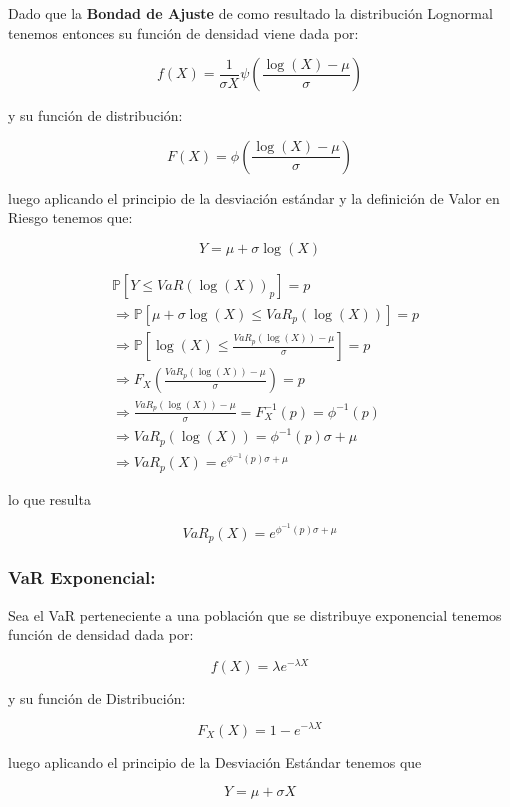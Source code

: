 \documentclass[]{article}
\begin{document}
Dado que la \textbf{Bondad de Ajuste} de como resultado la distribución
Lognormal tenemos entonces su función de densidad viene dada por:

\[f(X)=\frac{1}{\sigma X} \psi(\frac{\log(X)-\mu}{\sigma})\]

y su función de distribución:

\[F(X)=\phi(\frac{\log(X)-\mu}{\sigma})\]

luego aplicando el principio de la desviación estándar y la definición
de Valor en Riesgo tenemos que:

\[Y = \mu + \sigma \log(X)\]

\[\begin{array}{rl}  
&\displaystyle \mathbb{P}[Y \leq VaR(\log(X))_p]=p\\
&\displaystyle \Rightarrow \mathbb{P}[\mu + \sigma \log(X) \leq VaR_p(\log(X))] = p\\
&\displaystyle \Rightarrow \mathbb{P}[\log(X) \leq \frac{VaR_{p}(\log(X))- \mu}{\sigma}] = p\\
&\displaystyle \Rightarrow F_X(\frac{VaR_{p}(\log(X))- \mu}{\sigma}) = p\\
&\displaystyle \Rightarrow \frac{VaR_{p}(\log(X))- \mu}{\sigma} = F_X^{-1}(p)=\phi^{-1}(p)\\
&\displaystyle \Rightarrow VaR_{p}(\log(X))=\phi^{-1}(p) \sigma + \mu\\
&\displaystyle \Rightarrow VaR_{p}(X)=e^{\phi^{-1}(p) \sigma + \mu}
\end{array}\]

lo que resulta

\[VaR_{p}(X)=e^{\phi^{-1}(p) \sigma + \mu}\]

\hypertarget{var-exponencial}{%
\subsubsection{\texorpdfstring{\textbf{VaR
Exponencial:}}{VaR Exponencial:}}\label{var-exponencial}}

Sea el VaR perteneciente a una población que se distribuye exponencial
tenemos función de densidad dada por:

\[f(X)= \lambda e^{-\lambda X}\]

y su función de Distribución:

\[F_X(X)= 1-e^{-\lambda X}\]

luego aplicando el principio de la Desviación Estándar tenemos que

\[Y = \mu + \sigma X\]
\end{document}
